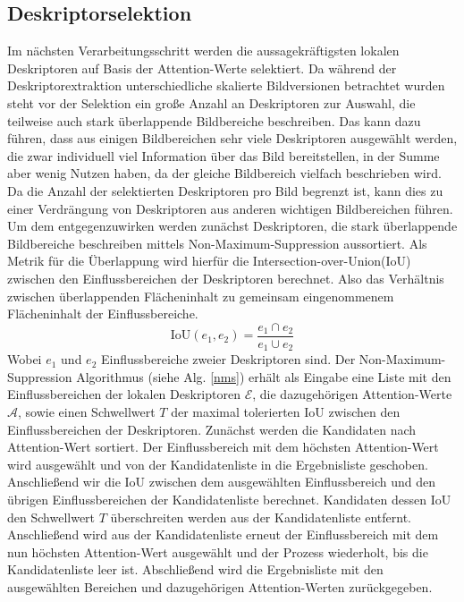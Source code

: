 \subsection{Deskriptorselektion}
Im nächsten Verarbeitungsschritt werden die aussagekräftigsten lokalen Deskriptoren auf Basis der Attention-Werte selektiert. Da während der Deskriptorextraktion unterschiedliche skalierte Bildversionen betrachtet wurden steht vor der Selektion ein große Anzahl an Deskriptoren zur Auswahl, die teilweise auch stark überlappende Bildbereiche beschreiben. Das kann dazu führen, dass aus einigen Bildbereichen sehr viele Deskriptoren ausgewählt werden, die zwar individuell viel Information über das Bild bereitstellen, in der Summe aber wenig Nutzen haben, da der gleiche Bildbereich vielfach beschrieben wird. Da die Anzahl der selektierten Deskriptoren pro Bild begrenzt ist, kann dies zu einer Verdrängung von Deskriptoren aus anderen wichtigen Bildbereichen führen. Um dem entgegenzuwirken werden zunächst Deskriptoren, die stark überlappende Bildbereiche beschreiben mittels Non-Maximum-Suppression aussortiert. Als Metrik für die Überlappung wird hierfür die Intersection-over-Union(IoU) zwischen den Einflussbereichen der Deskriptoren berechnet. Also das Verhältnis zwischen überlappenden Flächeninhalt zu gemeinsam eingenommenem Flächeninhalt der Einflussbereiche.
\begin{equation}
\text{IoU}(e_1,e_2) = \frac{e_1 \cap e_2}{e_1 \cup e_2}
\end{equation}
Wobei $e_1$ und $e_2$ Einflussbereiche zweier Deskriptoren sind. Der Non-Maximum-Suppression Algorithmus (siehe Alg. \ref{nms}) erhält als Eingabe eine Liste mit den Einflussbereichen der lokalen Deskriptoren $\mathcal{E}$, die dazugehörigen Attention-Werte $\mathcal{A}$, sowie einen Schwellwert $T$ der maximal tolerierten IoU zwischen den Einflussbereichen der Deskriptoren. Zunächst werden die Kandidaten nach Attention-Wert sortiert. Der Einflussbereich mit dem höchsten Attention-Wert wird ausgewählt und von der Kandidatenliste in die Ergebnisliste geschoben. Anschließend wir die IoU zwischen dem ausgewählten Einflussbereich und den übrigen Einflussbereichen der Kandidatenliste berechnet. Kandidaten dessen IoU den Schwellwert $T$ überschreiten werden aus der Kandidatenliste entfernt. Anschließend wird aus der Kandidatenliste erneut der Einflussbereich mit dem nun höchsten Attention-Wert ausgewählt und der Prozess wiederholt, bis die Kandidatenliste leer ist. Abschließend wird die Ergebnisliste mit den ausgewählten Bereichen und dazugehörigen Attention-Werten zurückgegeben.

